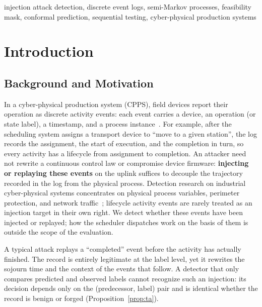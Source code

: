 \documentclass[manuscript,screen,review]{acmart}
\begin{document}

\begin{keywords}
injection attack detection, discrete event logs, semi-Markov processes, feasibility mask,
conformal prediction, sequential testing, cyber-physical production systems
\end{keywords}

\maketitle


\section{Introduction}
\label{sec:intro}

\subsection{Background and Motivation}
\label{sec:intro_bg}

In a cyber-physical production system (CPPS), field devices report their operation as discrete activity events: each event carries a device, an operation (or state label), a timestamp, and a process instance~\cite{monostori2016cpps,seiger2022factory}. For example, after the scheduling system assigns a transport device to ``move to a given station'', the log records the assignment, the start of execution, and the completion in turn, so every activity has a lifecycle from assignment to completion. An attacker need not rewrite a continuous control law or compromise device firmware: \textbf{injecting or replaying these events} on the uplink suffices to decouple the trajectory recorded in the log from the physical process. Detection research on industrial cyber-physical systems concentrates on physical process variables, perimeter protection, and network traffic~\cite{kayan2022icps}; lifecycle activity events are rarely treated as an injection target in their own right. We detect whether these events have been injected or replayed; how the scheduler dispatches work on the basis of them is outside the scope of the evaluation.

A typical attack replays a ``completed'' event before the activity has actually finished. The record is entirely legitimate at the label level, yet it rewrites the sojourn time and the context of the events that follow. A detector that only compares predicted and observed labels cannot recognize such an injection: its decision depends only on the (predecessor, label) pair and is identical whether the record is benign or forged (Proposition~\ref{prop:ta}).
\end{document}
